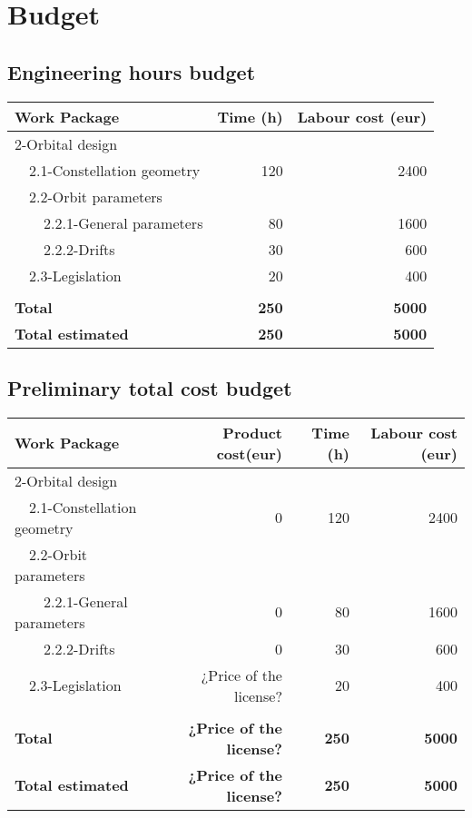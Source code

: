 \documentclass[12pt, titlepage]{article}
\begin{document}
\section{Budget}


\subsection{Engineering hours budget}
\begin{tabular}{ | l | r | r | }
\hline
Work Package & Time (h) & Labour cost (eur) \\ \hline
2-Orbital design &  &  \\ \hline
~~2.1-Constellation geometry & 120 & 2400\\ \hline
~~2.2-Orbit parameters &  &  \\ \hline
~~~~2.2.1-General parameters & 80 & 1600 \\ \hline
~~~~2.2.2-Drifts & 30 & 600 \\ \hline
~~2.3-Legislation & 20 & 400 \\ \hline
 &  &  \\ \hline
\textbf{Total} & \textbf{250} & \textbf{5000} \\ \hline
\textbf{Total estimated} & \textbf{250} & \textbf{5000} \\
\hline
\end{tabular}
 

\subsection{Preliminary total cost budget} 
\begin{tabular}{ | l | r | r | r | }
\hline
Work Package & Product cost(eur) & Time (h) & Labour cost (eur) \\ \hline
2-Orbital design &  &  &  \\ \hline
~~2.1-Constellation geometry & 0 & 120 & 2400 \\ \hline
~~2.2-Orbit parameters &  &  &  \\ \hline
~~~~2.2.1-General parameters & 0 & 80 & 1600 \\ \hline
~~~~2.2.2-Drifts & 0 & 30 & 600 \\ \hline
~~2.3-Legislation & ¿Price of the license? & 20 & 400 \\ \hline
 &  &  &  \\ \hline
\textbf{Total} & \textbf{¿Price of the license?} & \textbf{250} & \textbf{5000} \\ \hline
\textbf{Total estimated} & \textbf{¿Price of the license?} & \textbf{250} & \textbf{5000} \\
\hline
\end{tabular}


\pagebreak


\end{document}
